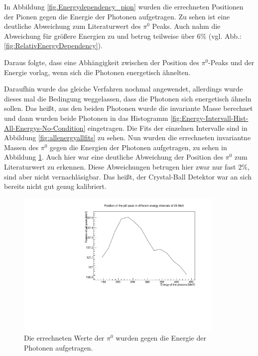 \documentclass[a4paper,11pt,oneside,final,german,openbib,pdftex]{scrbook}
\begin{document}
{In Abbildung \ref{fig.Energydependency_pion} wurden die errechneten Positionen der Pionen gegen die Energie der Photonen aufgetragen. Zu sehen ist eine deutliche Abweichung zum Literaturwert des $\pi^0$ Peaks. Auch nahm die Abweichung für größere Energien zu und betrug teilweise über 6\% (vgl. Abb.:\ref{fig:RelativEnergyDependency}).
  
Daraus folgte, dass eine Abhängigkeit zwischen der Position des $\pi^0$-Peaks und der Energie vorlag, wenn sich die Photonen energetisch ähnelten.

Daraufhin wurde das gleiche Verfahren nochmal angewendet, allerdings wurde dieses mal die Bedingung weggelassen, dass die Photonen sich energetisch ähneln sollen. Das heißt, aus den beiden Photonen wurde die invariante Masse berechnet und dann wurden beide Photonen in das Histogramm  \ref{fig:Energy-Intervall-Hist-All-Energys-No-Condition} eingetragen.
Die Fits der einzelnen Intervalle sind in Abbildung \ref{fig:allenergyallfits} zu sehen. Nun wurden die errechneten invariantne Massen des $\pi^0$ gegen die Energien der Photonen aufgetragen, zu sehen in Abbildung \ref{fig:Energy-Intervall-No-Condition-Deviation-1303}. Auch hier war eine deutliche Abweichung der Position des $\pi^0$ zum Literaturwert zu erkennen. Diese Abweichungen betrugen hier zwar nur fast 2\%, sind aber nicht vernachl\"asigbar. Das hei{\ss}t, der Crystal-Ball Detektor war an sich bereits nicht gut genug kalibriert.

\begin{figure}[h]
	\begin{center}
		\includegraphics[width=100mm]{allenergydeviation1303}
		\caption{Die errechneten Werte der $\pi^0$ wurden gegen die Energie der Photonen aufgetragen.}
		\label{fig:Energy-Intervall-No-Condition-Deviation-1303}
	\end{center}
\end{figure}



}
\end{document}
